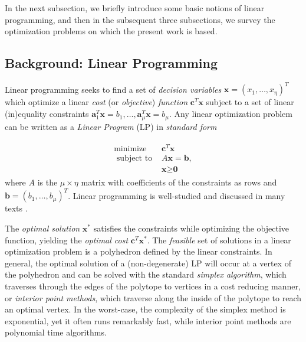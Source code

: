  
 
\label{sec:minimalgenerators}

In the next subsection, we briefly introduce some basic notions of linear programming, and then in the subsequent three subsections, we survey the optimization problems on which the present work is based.

\subsection{Background: Linear Programming}

Linear programming seeks to find a set of \emph{decision variables} $\textbf{x}=(x_1,\ldots,x_\eta)^T$ which optimize a linear \emph{cost} (or \emph{objective}) \emph{function} $\textbf{c}^T\textbf{x}$ subject to a set of linear (in)equality constraints $\textbf{a}_1^T\textbf{x}=b_1, \ldots, \textbf{a}_\mu^T\textbf{x}=b_\mu$. Any linear optimization problem can be written as a \emph{Linear Program} (LP) in \emph{standard form}  

\begin{align}
   \begin{split}
    \text{minimize } & \textbf{c}^T\textbf{x} \\
    \text{ subject to } & A\textbf{x}=\textbf{b}, \\
    & \textbf{x} \geq \textbf{0}
   \end{split}
   \label{eq:linearprogram}
\end{align}
where $A$ is the $\mu \times \eta$ matrix with coefficients of the constraints as rows and $\textbf{b}=(b_1,\ldots,b_\mu)^T$. Linear programming is well-studied and discussed in many texts \cite{bertsimas-LPbook, Vanderbei-LPbook,BoyVan2004}.

The \emph{optimal solution} $\textbf{x}^*$ satisfies the constraints while optimizing the objective function, yielding the \emph{optimal cost} $\textbf{c}^T\textbf{x}^*$. The \emph{feasible} set of solutions in a linear optimization problem is a polyhedron defined by the linear constraints. In general, the optimal solution of a (non-degenerate) LP will occur at a vertex of the polyhedron and can be solved with the standard \emph{simplex algorithm}, which traverses through the edges of the polytope to vertices in a cost reducing manner, or \emph{interior point methods}, which traverse along the inside of the polytope to reach an optimal vertex. In the worst-case, the complexity of the simplex method is exponential, yet it often runs remarkably fast, while interior point methods are polynomial time algorithms.

